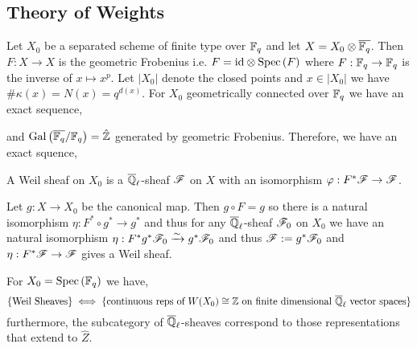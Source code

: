\documentclass[12pt]{article}
\begin{document}
\subsection{Theory of Weights}

Let $X_0$ be a separated scheme of finite type over $\mathbb{F}_q$ and let $X = X_0 \otimes \overline{\mathbb{F}_q}$. Then $F : X \to X$ is the geometric Frobenius i.e. $F = \mathrm{id} \otimes \mathrm{Spec}\left( F \right)$ where $F : \mathbb{F}_q \to \mathbb{F}_q$ is the inverse of $x \mapsto x^p$. Let $|X_0|$ denote the closed points and $x \in | X_0 |$ we have $\# \kappa(x) = N(x) = q^{d(x)}$. For $X_0$ geometrically connected over $\mathbb{F}_q$ we have an exact sequence,
\begin{center}
\end{center}
and $\mathrm{Gal}\left( \overline{\mathbb{F}_q}/\mathbb{F}_q \right) = \hat{\mathbb{Z}}$ generated by geometric Frobenius. Therefore, we have an exact squence,
\begin{center}
\end{center}

\begin{defn}
A Weil sheaf on $X_0$ is a $\overline{\mathbb{Q}}_\ell$-sheaf $\mathscr{F}$ on $X$ with an isomorphism $\varphi : F^* \mathscr{F} \to \mathscr{F}$. 
\end{defn}

\begin{rmk}
Let $g : X \to X_0$ be the canonical map. Then $g \circ F = g$ so there is a natural isomorphism $\eta : F^* \circ g^* \to g^*$ and thus for any $\overline{\mathbb{Q}}_\ell$-sheaf $\mathscr{F}_0$ on $X_0$ we have an natural isomorphism $\eta : F^* g^* \mathscr{F}_0 \xrightarrow{\sim} g^* \mathscr{F}_0$ and thus $\mathscr{F} := g^* \mathscr{F}_0$ and $\eta : F^* \mathscr{F} \to \mathscr{F}$ gives a Weil sheaf.
\end{rmk}

\begin{exercise}
For $X_0 = \mathrm{Spec}\left( \mathbb{F}_q \right)$ we have,
\[ \{ \text{Weil Sheaves} \} \iff \{ \text{continuous reps of } W(X_0) \cong \mathbb{Z} \text{ on finite dimensional } \overline{\mathbb{Q}}_\ell \text{ vector spaces} \} \]
furthermore, the subcategory of $\overline{\mathbb{Q}}_\ell$-sheaves correspond to those representations that extend to $\hat{Z}$.
\end{exercise}
\end{document}
